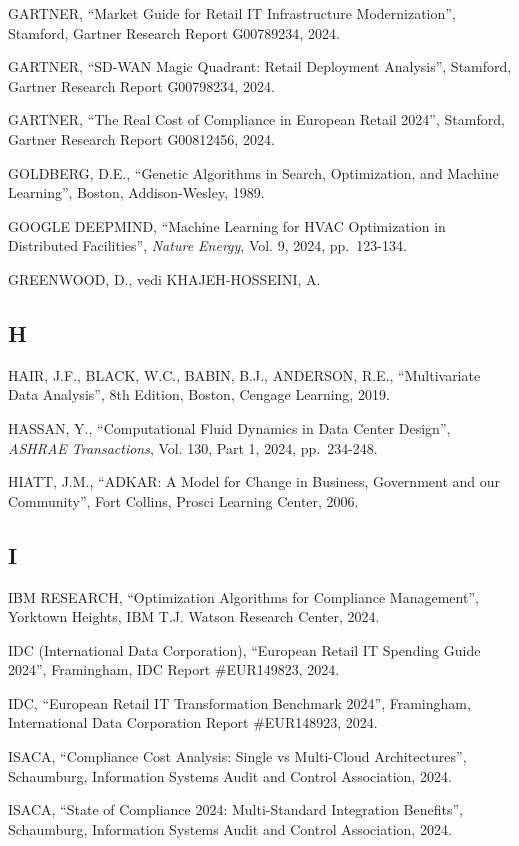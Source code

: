 \documentclass{report}
\begin{document}
GARTNER, ``Market Guide for Retail IT Infrastructure Modernization'',
Stamford, Gartner Research Report G00789234, 2024.

GARTNER, ``SD-WAN Magic Quadrant: Retail Deployment Analysis'',
Stamford, Gartner Research Report G00798234, 2024.

GARTNER, ``The Real Cost of Compliance in European Retail 2024'',
Stamford, Gartner Research Report G00812456, 2024.

GOLDBERG, D.E., ``Genetic Algorithms in Search, Optimization, and
Machine Learning'', Boston, Addison-Wesley, 1989.

GOOGLE DEEPMIND, ``Machine Learning for HVAC Optimization in Distributed
Facilities'', \emph{Nature Energy}, Vol. 9, 2024, pp.~123-134.

GREENWOOD, D., vedi KHAJEH-HOSSEINI, A.

\subsection{H}\label{h-1}

HAIR, J.F., BLACK, W.C., BABIN, B.J., ANDERSON, R.E., ``Multivariate
Data Analysis'', 8th Edition, Boston, Cengage Learning, 2019.

HASSAN, Y., ``Computational Fluid Dynamics in Data Center Design'',
\emph{ASHRAE Transactions}, Vol. 130, Part 1, 2024, pp.~234-248.

HIATT, J.M., ``ADKAR: A Model for Change in Business, Government and our
Community'', Fort Collins, Prosci Learning Center, 2006.

\subsection{I}\label{i-1}

IBM RESEARCH, ``Optimization Algorithms for Compliance Management'',
Yorktown Heights, IBM T.J. Watson Research Center, 2024.

IDC (International Data Corporation), ``European Retail IT Spending
Guide 2024'', Framingham, IDC Report \#EUR149823, 2024.

IDC, ``European Retail IT Transformation Benchmark 2024'', Framingham,
International Data Corporation Report \#EUR148923, 2024.

ISACA, ``Compliance Cost Analysis: Single vs Multi-Cloud
Architectures'', Schaumburg, Information Systems Audit and Control
Association, 2024.

ISACA, ``State of Compliance 2024: Multi-Standard Integration
Benefits'', Schaumburg, Information Systems Audit and Control
Association, 2024.
\end{document}
